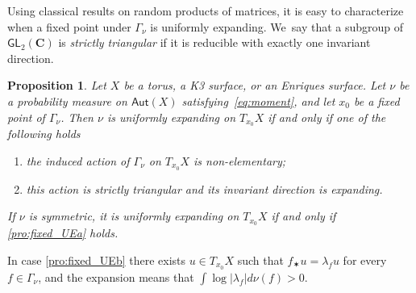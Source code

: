 \documentclass[JEP,XML,SOM,Unicode,published]{cedram}
\newenvironment{enumeratea}
{\bgroup\def\theenumi{\alph{enumi}}\begin{enumerate}}
{\end{enumerate}\egroup}
\newcommand{\abs}[1]{\left\vert#1\right\vert}
\def\C{\mathbf{C}}
\newcommand\Aut{\mathsf{Aut}}
\newcommand\GL{{\mathsf{GL}}}
\theoremstyle{plain}
\newtheorem{pro}[thm]{Proposition}
\theoremstyle{definition}
\begin{document}
Using classical results on random products of matrices, it is easy
to characterize when a fixed point under $\Gamma_\nu$ is uniformly expanding. We~say that a subgroup of $\GL_2(\C)$ is
\emph{strictly triangular} if it is reducible with exactly one invariant direction.

\begin{pro}\label{pro:fixed_UE}
Let $X$ be a torus, a K3 surface, or an Enriques surface. Let
$\nu$ be a probability measure on $\Aut(X)$ satisfying~\eqref{eq:moment}, and let $x_0$ be a fixed point of
$\Gamma_\nu$. Then $\nu$ is uniformly expanding on $T_{x_0}X$ if and only if one of the following holds
\begin{enumeratea}
\item\label{pro:fixed_UEa} the
induced action of $\Gamma_\nu$ on $ T_{x_0}X$ is non-elementary;
\item\label{pro:fixed_UEb} this action is strictly triangular and its invariant direction
is expanding.
\end{enumeratea}
If $\nu$ is symmetric, it is uniformly expanding on $T_{x_0}X$ if and only if \eqref{pro:fixed_UEa} holds.
\end{pro}

In case \eqref{pro:fixed_UEb} there exists $ u\in T_{x_0}X$ such that $f_\varstar u = \lambda_f u$ for every $f\in \Gamma_\nu$, and the expansion means that $\int \log \abs{\lambda_f} d\nu(f) >0$.
\end{document}
